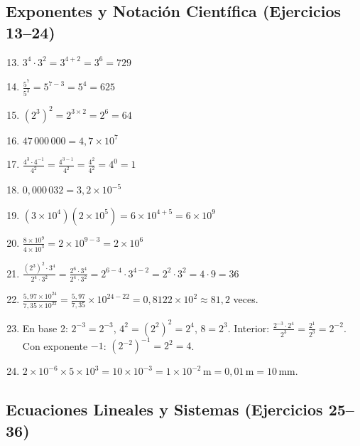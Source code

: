 \documentclass[12pt, a4paper]{article}
\begin{document}
\subsection*{Exponentes y Notación Científica (Ejercicios 13--24)}

\begin{enumerate}[leftmargin=*, label=\textbf{\arabic*.}]
  \setcounter{enumi}{12}
  \item $3^4 \cdot 3^2 = 3^{4+2} = 3^6 = 729$

  \item $\frac{5^7}{5^3} = 5^{7-3} = 5^4 = 625$

  \item $(2^3)^2 = 2^{3 \times 2} = 2^6 = 64$

  \item $47\,000\,000 = 4{,}7 \times 10^7$

  \item $\frac{4^3 \cdot 4^{-1}}{4^2} = \frac{4^{3-1}}{4^2} = \frac{4^2}{4^2} = 4^0 = 1$

  \item $0{,}000\,032 = 3{,}2 \times 10^{-5}$

  \item $(3 \times 10^4)(2 \times 10^5) = 6 \times 10^{4+5} = 6 \times 10^9$

  \item $\frac{8 \times 10^9}{4 \times 10^3} = 2 \times 10^{9-3} = 2 \times 10^6$

  \item $\frac{(2^3)^2 \cdot 3^4}{2^4 \cdot 3^2} = \frac{2^6 \cdot 3^4}{2^4 \cdot 3^2} = 2^{6-4} \cdot 3^{4-2} = 2^2 \cdot 3^2 = 4 \cdot 9 = 36$

  \item $\frac{5{,}97 \times 10^{24}}{7{,}35 \times 10^{22}} = \frac{5{,}97}{7{,}35} \times 10^{24-22} = 0{,}8122 \times 10^2 \approx 81{,}2$ veces.

  \item En base 2: $2^{-3} = 2^{-3}$, $4^2 = (2^2)^2 = 2^4$, $8 = 2^3$. Interior: $\frac{2^{-3} \cdot 2^4}{2^3} = \frac{2^1}{2^3} = 2^{-2}$. Con exponente $-1$: $(2^{-2})^{-1} = 2^2 = 4$.

  \item $2 \times 10^{-6} \times 5 \times 10^3 = 10 \times 10^{-3} = 1 \times 10^{-2}\,\text{m} = 0{,}01\,\text{m} = 10\,\text{mm}$.
\end{enumerate}

\subsection*{Ecuaciones Lineales y Sistemas (Ejercicios 25--36)}
\end{document}

